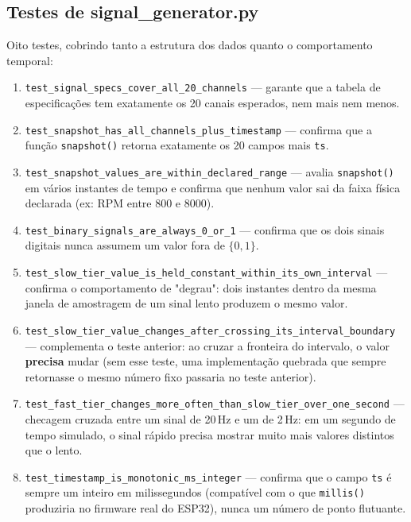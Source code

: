 \documentclass[11pt,a4paper]{article}
\begin{document}
\subsection{Testes de signal\_generator.py}

Oito testes, cobrindo tanto a estrutura dos dados quanto o comportamento temporal:

\begin{enumerate}[label=\textbf{Teste \arabic*}]
    \item \texttt{test\_signal\_specs\_cover\_all\_20\_channels} --- garante que a tabela de especificações tem exatamente os 20 canais esperados, nem mais nem menos.
    \item \texttt{test\_snapshot\_has\_all\_channels\_plus\_timestamp} --- confirma que a função \texttt{snapshot()} retorna exatamente os 20 campos mais \texttt{ts}.
    \item \texttt{test\_snapshot\_values\_are\_within\_declared\_range} --- avalia \texttt{snapshot()} em vários instantes de tempo e confirma que nenhum valor sai da faixa física declarada (ex: RPM entre 800 e 8000).
    \item \texttt{test\_binary\_signals\_are\_always\_0\_or\_1} --- confirma que os dois sinais digitais nunca assumem um valor fora de $\{0, 1\}$.
    \item \texttt{test\_slow\_tier\_value\_is\_held\_constant\_within\_its\_own\_interval} --- confirma o comportamento de "degrau": dois instantes dentro da mesma janela de amostragem de um sinal lento produzem o mesmo valor.
    \item \texttt{test\_slow\_tier\_value\_changes\_after\_crossing\_its\_interval\_boundary} --- complementa o teste anterior: ao cruzar a fronteira do intervalo, o valor \textbf{precisa} mudar (sem esse teste, uma implementação quebrada que sempre retornasse o mesmo número fixo passaria no teste anterior).
    \item \texttt{test\_fast\_tier\_changes\_more\_often\_than\_slow\_tier\_over\_one\_second} --- checagem cruzada entre um sinal de 20\,Hz e um de 2\,Hz: em um segundo de tempo simulado, o sinal rápido precisa mostrar muito mais valores distintos que o lento.
    \item \texttt{test\_timestamp\_is\_monotonic\_ms\_integer} --- confirma que o campo \texttt{ts} é sempre um inteiro em milissegundos (compatível com o que \texttt{millis()} produziria no firmware real do ESP32), nunca um número de ponto flutuante.
\end{enumerate}
\end{document}
